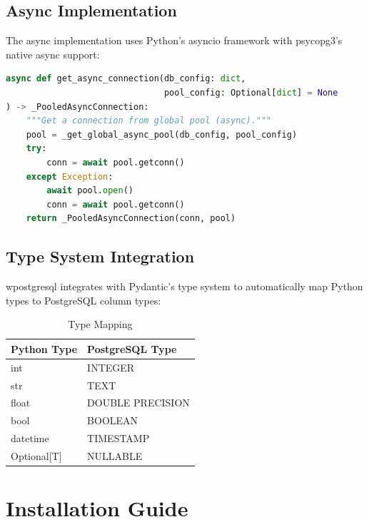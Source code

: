 \documentclass[12pt,a4paper]{report}
\begin{document}
\section{Async Implementation}

The async implementation uses Python's asyncio framework with psycopg3's native async support:

\begin{lstlisting}[language=Python, caption=Async Connection Flow]
async def get_async_connection(db_config: dict, 
                               pool_config: Optional[dict] = None
) -> _PooledAsyncConnection:
    """Get a connection from global pool (async)."""
    pool = _get_global_async_pool(db_config, pool_config)
    try:
        conn = await pool.getconn()
    except Exception:
        await pool.open()
        conn = await pool.getconn()
    return _PooledAsyncConnection(conn, pool)
\end{lstlisting}

\section{Type System Integration}

wpostgresql integrates with Pydantic's type system to automatically map Python types to PostgreSQL column types:

\begin{table}[H]
	\centering
	\caption{Type Mapping}
	\begin{tabular}{@{}ll@{}}
		\toprule
		\textbf{Python Type} & \textbf{PostgreSQL Type} \\
		\midrule
		int                  & INTEGER                  \\
		str                  & TEXT                     \\
		float                & DOUBLE PRECISION         \\
		bool                 & BOOLEAN                  \\
		datetime             & TIMESTAMP                \\
		Optional[T]          & NULLABLE                 \\
		\bottomrule
	\end{tabular}
\end{table}

\chapter{Installation Guide}
\end{document}
